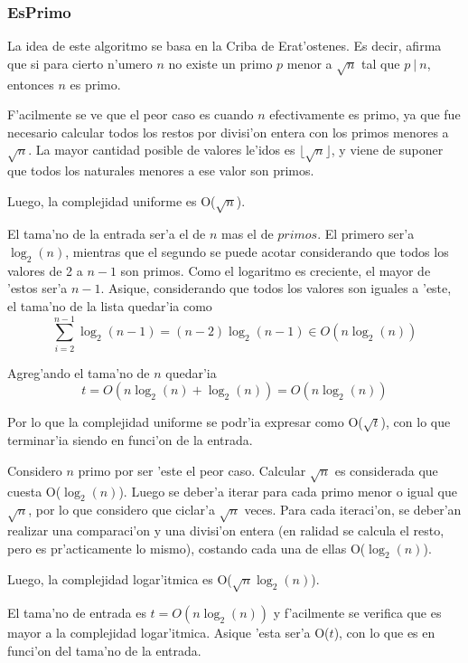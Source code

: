 \subsubsection{EsPrimo}


La idea de este algoritmo se basa en la Criba de Erat'ostenes. Es decir, afirma que si para cierto n'umero $n$ no existe un primo $p$ menor a $\sqrt{n}$ tal que $p\ |\ n$, entonces $n$ es primo. 

F'acilmente se ve que el peor caso es cuando $n$ efectivamente es primo, ya que fue necesario calcular todos los restos por divisi'on entera con los primos menores a $\sqrt{n}$. La mayor cantidad posible de valores le'idos es $\lfloor\sqrt{n}\rfloor$, y viene de suponer que todos los naturales menores a ese valor son primos.

Luego, la complejidad uniforme es O($\sqrt{n}$).

El tama'no de la entrada ser'a el de $n$ mas el de $primos$. El primero ser'a $\log_2(n)$, mientras que el segundo se puede acotar considerando que todos los valores de 2 a $n-1$ son primos. Como el logaritmo es creciente, el mayor de 'estos ser'a $n-1$. Asique, considerando que todos los valores son iguales a 'este, el tama'no de la lista quedar'ia como
$$\sum_{i=2}^{n-1} \log_2(n-1) = (n-2)\log_2(n-1) \in O(n\log_2(n))$$

Agreg'ando el tama'no de $n$ quedar'ia
$$t = O(n\log_2(n) + \log_2(n)) = O(n\log_2(n))$$

Por lo que la complejidad uniforme se podr'ia expresar como O($\sqrt{t}$), con lo que terminar'ia siendo  en funci'on de la entrada.

\vspace{2em}


Considero $n$ primo por ser 'este el peor caso. Calcular $\sqrt{n}$ es considerada que cuesta O($\log_2(n)$). Luego se deber'a iterar para cada primo menor o igual que $\sqrt{n}$, por lo que considero que ciclar'a $\sqrt{n}$ veces. Para cada iteraci'on, se deber'an realizar una comparaci'on y una divisi'on entera (en ralidad se calcula el resto, pero es pr'acticamente lo mismo), costando cada una de ellas O($\log_2(n)$). 

Luego, la complejidad logar'itmica es O($\sqrt{n}\log_2(n)$).

El tama'no de entrada es $t = O(n\log_2(n))$ y f'acilmente se verifica que es mayor a la complejidad logar'itmica. Asique 'esta ser'a O($t$), con lo que es  en funci'on del tama'no de la entrada.


